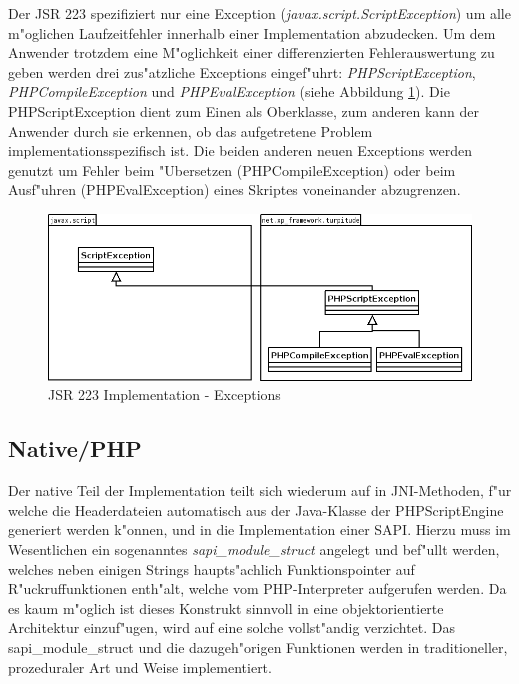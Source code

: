 Der JSR 223 spezifiziert nur eine Exception (\emph{javax.script.ScriptException}) um alle m"oglichen Laufzeitfehler innerhalb einer 
Implementation abzudecken. Um dem Anwender trotzdem eine M"oglichkeit einer differenzierten Fehlerauswertung zu geben werden drei
zus"atzliche Exceptions eingef"uhrt: \emph{PHPScriptException}, \emph{PHPCompileException} und \emph{PHPEvalException} (siehe Abbildung
\ref{fig:jsr223exceptions}). Die PHPScriptException dient zum Einen als Oberklasse, zum anderen kann der Anwender durch sie erkennen, ob
das aufgetretene Problem implementationsspezifisch ist. Die beiden anderen neuen Exceptions werden genutzt um Fehler beim "Ubersetzen 
(PHPCompileException) oder beim Ausf"uhren (PHPEvalException) eines Skriptes voneinander abzugrenzen.

\begin{figure}[h]
\includegraphics[width=\textwidth]{chap1/img/exceptions.png}
\caption{JSR 223 Implementation - Exceptions}
\label{fig:jsr223exceptions}
\end{figure}

\subsection{Native/PHP}
\label{sec:chap1:design:native}

Der native Teil der Implementation teilt sich wiederum auf in JNI-Methoden, f"ur welche die Headerdateien automatisch aus
der Java-Klasse der PHPScriptEngine generiert werden k"onnen, und in die Implementation einer SAPI. Hierzu muss im
Wesentlichen ein sogenanntes \emph{sapi\_module\_struct} angelegt und bef"ullt werden, welches neben einigen Strings
haupts"achlich Funktionspointer auf R"uckruffunktionen enth"alt, welche vom PHP-Interpreter aufgerufen werden. Da es
kaum m"oglich ist dieses Konstrukt sinnvoll in eine objektorientierte Architektur einzuf"ugen, wird auf eine solche
vollst"andig verzichtet. Das sapi\_module\_struct und die dazugeh"origen Funktionen werden in traditioneller,
prozeduraler Art und Weise implementiert.

